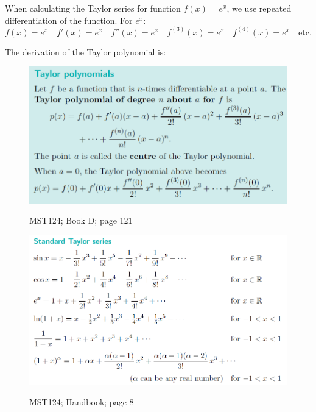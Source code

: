 \documentclass[a4paper, 12pt]{article}
\numberwithin{equation}{QEq}	%
\begin{document}
\vspace{15mm}

When calculating the Taylor series for function \(f(x)=e^x\), we use repeated differentiation of the function. For \(e^x\):
\[
	f(x)=e^x \quad f'(x)=e^x \quad f''(x)=e^x \quad f^{(3)}(x)=e^x \quad f^{(4)}(x)=e^x \quad \text{etc.}
\]

The derivation of the Taylor polynomial is:
\begin{figure}[h!]
\centering
	\includegraphics[scale=0.72]{TaylorPolynomial.png} \\
	\caption{MST124; Book D; page 121}
\end{figure}

\vspace{15mm}

\begin{figure}[h!]
\centering
	\includegraphics[scale=0.72]{TaylorSeries_HB.png} \\
	\caption{MST124; Handbook; page 8}
\end{figure}
\end{document}

